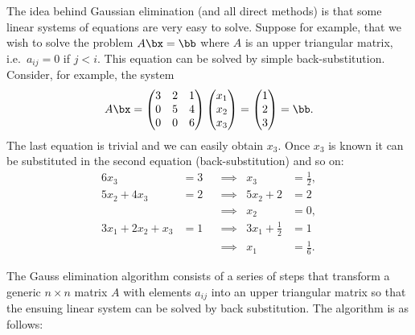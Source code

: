 The idea behind Gaussian elimination (and all direct methods) is that
some linear systems of equations are very easy to solve.   Suppose for
example, that we wish to solve the problem $A \bx = \bb$ where $A$ is
an upper triangular matrix, i.e.\ $a_{i j} = 0$ if $j < i$.    This
equation can be solved by simple back-substitution.   Consider, for
example, the system
%
\begin{equation*}
  A \bx =
  \begin{pmatrix}
    3 & 2 & 1 \\ 0 & 5 & 4 \\ 0 & 0 & 6
  \end{pmatrix}
  \begin{pmatrix}
    x_1 \\ x_2 \\ x_3
  \end{pmatrix}
 =
 \begin{pmatrix}
   1 \\ 2 \\ 3
 \end{pmatrix}
 = \bb .
\end{equation*}
%
The last equation is trivial and we can easily obtain $x_3$.  Once
$x_3$ is known it can be substituted in the second equation
(back-substitution) and so on:
%
\begin{align*}
 6 x_3               & = 3 && \implies & x_3                 & = \frac{1}{2} , \\
 5 x_2 + 4 x_3       & = 2 && \implies & 5 x_2 + 2           & = 2 \\
                     &     && \implies & x_2                 & = 0 , \\
 3 x_1 + 2 x_2 + x_3 & = 1 && \implies & 3 x_1 + \frac{1}{2} & = 1 \\
                     &     && \implies & x_1                 & = \frac{1}{6} .
\end{align*}

The Gauss elimination algorithm consists of a series of steps that
transform a generic $n \times n$ matrix $A$ with elements $a_{i j}$
into an upper triangular matrix so that the ensuing linear system can
be solved by back substitution.  The algorithm is as follows:

